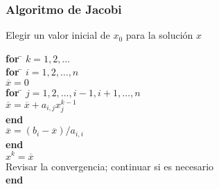 \begin{frame}
\frametitle{Algoritmo de Jacobi}
Elegir un valor inicial de $x_{0}$ para la solución $x$\\
\begin{tabbing}
\textbf{for} \= $k=1,2, \ldots$ \\
\> \textbf{for} \= $i=1,2, \ldots,n$ \\
\> \> $\overline{x}=0$ \\
\> \> \textbf{for} \= $j=1,2, \ldots , i-1 , i+1,\ldots,n$ \\
\> \> \> $\overline{x} = \overline{x} + a_{i,j} x_{j}^{k-1}$ \\
\> \> \textbf{end} \\
\> \> $\overline{x}=(b_{i}-\overline{x})/a_{i,i}$ \\
\> \textbf{end} \\
\> $x^{k} = \overline{x}$ \\
\> Revisar la convergencia; continuar si es necesario \\
\textbf{end}
\end{tabbing}
\end{frame}
